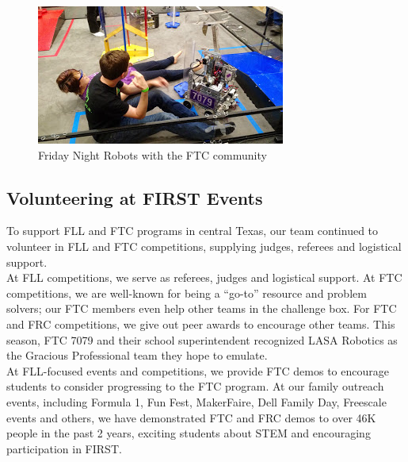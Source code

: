 \begin{figure}[H]
	\centering
	\includegraphics[height=0.7\linewidth]{fridaynight}
	\caption[]{Friday Night Robots with the FTC community}
	\label{fig:fridaynight}
\end{figure}

\subsection{Volunteering at FIRST Events}
To support FLL and FTC programs in central Texas, our team continued to volunteer in FLL and FTC competitions, supplying judges, referees and logistical support.\\

At FLL competitions, we serve as referees, judges and logistical support. At FTC competitions, we are well-known for being a “go-to” resource and problem solvers; our FTC members even help other teams in the challenge box. For FTC and FRC competitions, we give out peer awards to encourage other teams. This season, FTC 7079 and their school superintendent recognized LASA Robotics as the Gracious Professional team they hope to emulate.\\
 
At FLL-focused events and competitions, we provide FTC demos to encourage students to consider progressing to the FTC program. At our family outreach events, including Formula 1, Fun Fest, MakerFaire, Dell Family Day, Freescale events and others, we have demonstrated  FTC and FRC demos to over 46K people in the past 2 years, exciting students about STEM and encouraging participation in FIRST.\\

